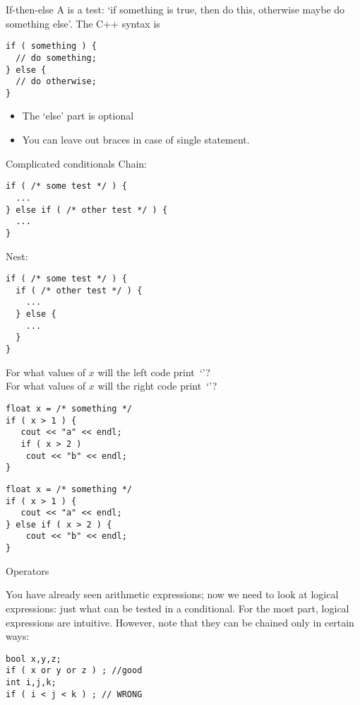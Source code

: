 \begin{slide}{If-then-else}
  \label{sl:ifthenelse}
  A  is a test: `if something is true, then do
  this, otherwise maybe do something else'. The C++ syntax is
\begin{lstlisting}
if ( something ) {
  // do something;
} else {
  // do otherwise;
}
\end{lstlisting}
\begin{itemize}
\item The `else' part is optional
\item You can leave out braces in case of single statement.
\end{itemize}
\end{slide}

\begin{slide}{Complicated conditionals}
  \label{sl:elseif}
  Chain:
\begin{lstlisting}
if ( /* some test */ ) {
  ...
} else if ( /* other test */ ) {
  ...
}
\end{lstlisting}
Nest:
\begin{lstlisting}
if ( /* some test */ ) {
  if ( /* other test */ ) {
    ...
  } else {
    ...
  }
}
\end{lstlisting}
\end{slide}

\begin{exercise}
  \label{ex:if-scope-ab}
  For what values of $x$ will the left code print~`'?\\
  For what values of $x$ will the right code print~`'?
  \begin{multicols}{2}
\begin{lstlisting}
float x = /* something */
if ( x > 1 ) {
   cout << "a" << endl;
   if ( x > 2 )
    cout << "b" << endl;
}
\end{lstlisting}
\columnbreak
\begin{lstlisting}
float x = /* something */
if ( x > 1 ) {
   cout << "a" << endl;
} else if ( x > 2 ) {
    cout << "b" << endl;
}
\end{lstlisting}
  \end{multicols}
\end{exercise}

 {Operators}

You have already seen arithmetic expressions; now we need to look at
logical expressions: just what can be tested in a conditional. 
For the most part, logical expressions are intuitive.
However, note that they can be chained only in certain ways:
\begin{lstlisting}
bool x,y,z;
if ( x or y or z ) ; //good
int i,j,k;
if ( i < j < k ) ; // WRONG
\end{lstlisting}

